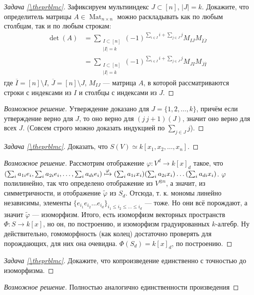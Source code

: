 \documentclass{article}
\theoremstyle{definition}
\theoremstyle{remark}
\newenvironment{solution}
{\begin{proof}[Возможное решение]}
{\end{proof}}
\newcounter{prblmc}
\newenvironment{prblm}
{\renewcommand{\qedsymbol}{}\begin{proof}[Задача \rm{\ref{\theprblmc}}]}
{\stepcounter{prblmc} \end{proof}}
\DeclareMathOperator{\Mat}{Mat}
\begin{document}
\begin{prblm}
    Зафиксируем мультииндекс $J \subset [n]$, $|J| = k$. Докажите, что определитель матрицы $A \in \Mat_{n \times n}$ можно раскладывать как по любым столбцам, так и по любым строкам:
    \begin{align*}
        \det(A) &= \sum_{\substack{I \subset [n] \\ |I| = k}} (-1)^{\sum_{i \in I} i + \sum_{j \in J} j} M_{I J} M_{\overline{I} \overline{J}} \\
        &= \sum_{\substack{I \subset [n] \\ |I| = k}} (-1)^{\sum_{i \in I} i + \sum_{j \in J} j} M_{J I} M_{\overline{J} \overline{I}}
    \end{align*}
    где $\overline{I} = [n] \setminus I$, $\overline{J} = [n] \setminus J$, $M_{I J}$ --- матрица $A$, в которой рассматриваются строки с индексами из $I$ и столбцы с индексами из $J$.
\end{prblm}
\begin{solution}
	Утверждение доказано для $J = \{1, 2, \ldots, k\}$, причём если утверждение верно для $J$, то оно верно для $(j\, j + 1)(J)$, значит оно верно для всех $J$. (Совсем строго можно доказать индукцией по $\sum_{j \in J} j$).
\end{solution}

\begin{prblm}
Доказать, что $S(V) \simeq k[x_1, x_2, \ldots, x_n]$.
\end{prblm}
\begin{solution}
	Рассмотрим отображение $\varphi: V^d \longrightarrow k[x]_d$ такое, что $(\sum_i a_{1i}e_i, \sum_i a_{2i} e_i, \ldots, \sum_i a_{di} e_i) \xmapsto{\varphi} (\sum_i a_{1i}x_i)(\sum_i a_{2i} x_i) \ldots (\sum_i a_{di} x_i)$. $\varphi$ полилинейно, так что определено отображение из $V^{\otimes n}$, а значит, из симметричности, и отображение $\tilde{\varphi}$ из $S_d$. Отсюда, т. к. мономы линейно независимы, элементы $\{e_{i_1} e_{i_2} \ldots e_{i_d}\}_{i_1 \le i_2 \le \ldots \le i_d}$ --- тоже. Но они всё порождают, а значит $\tilde{\varphi}$ --- изоморфизм. Итого, есть изоморфизм векторных пространств $\Phi: S \rightarrow k[x]$, но он, по построению, и изоморфизм градуированных $k$-алгебр. Ну действительно, гомоморфность (как колец) достаточно проверять для порождающих, для них она очевидна. $\Phi(S_d) = k[x]_d$, по построению.
\end{solution}

\begin{prblm}
    Докажите, что копроизведение единственно с точностью до изоморфизма.
\end{prblm}
\begin{solution}
	Полностью аналогично единственности произведения
\end{solution}
\end{document}
